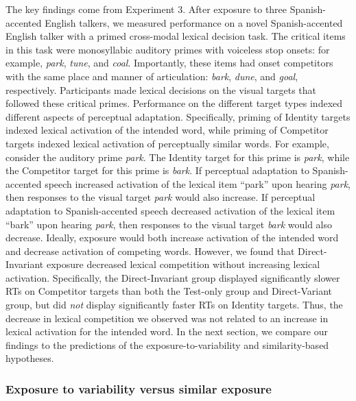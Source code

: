 \documentclass[preprint, 3p, authoryear]{elsarticle} %
\begin{document}
The key findings come from Experiment 3.
After exposure to three Spanish-accented English talkers, we measured performance on a novel Spanish-accented English talker with a primed cross-modal lexical decision task.
The critical items in this task were monosyllabic auditory primes with voiceless stop onsets: for example, \emph{park}, \emph{tune}, and \emph{coal}.
Importantly, these items had onset competitors with the same place and manner of articulation: \emph{bark}, \emph{dune}, and \emph{goal}, respectively.
Participants made lexical decisions on the visual targets that followed these critical primes.
Performance on the different target types indexed different aspects of perceptual adaptation.
Specifically, priming of Identity targets indexed lexical activation of the intended word, while priming of Competitor targets indexed lexical activation of perceptually similar words.
For example, consider the auditory prime \emph{park}.
The Identity target for this prime is \emph{park}, while the Competitor target for this prime is \emph{bark}.
If perceptual adaptation to Spanish-accented speech increased activation of the lexical item ``park'' upon hearing \emph{park}, then responses to the visual target \emph{park} would also increase.
If perceptual adaptation to Spanish-accented speech decreased activation of the lexical item ``bark'' upon hearing \emph{park}, then responses to the visual target \emph{bark} would also decrease.
Ideally, exposure would both increase activation of the intended word and decrease activation of competing words.
However, we found that Direct-Invariant exposure decreased lexical competition without increasing lexical activation.
Specifically, the Direct-Invariant group displayed significantly slower RTs on Competitor targets than both the Test-only group and Direct-Variant group, but did \emph{not} display significantly faster RTs on Identity targets.
Thus, the decrease in lexical competition we observed was not related to an increase in lexical activation for the intended word.
In the next section, we compare our findings to the predictions of the exposure-to-variability and similarity-based hypotheses.

\hypertarget{exposure-to-variability-versus-similar-exposure}{%
\subsubsection{Exposure to variability versus similar exposure}\label{exposure-to-variability-versus-similar-exposure}}
\end{document}
